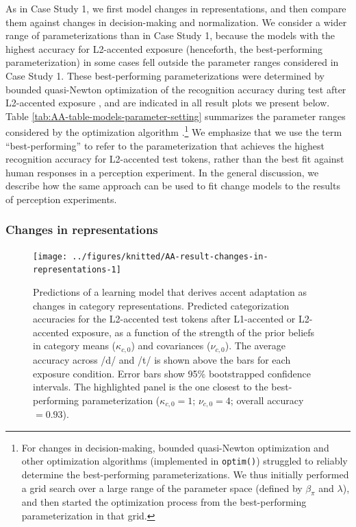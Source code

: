 \documentclass[
  11pt,
  man,floatsintext]{apa6}
\begin{document}
As in Case Study 1, we first model changes in representations, and then compare them against changes in decision-making and normalization. We consider a wider range of parameterizations than in Case Study 1, because the models with the highest accuracy for L2-accented exposure (henceforth, the best-performing parameterization) in some cases fell outside the parameter ranges considered in Case Study 1. These best-performing parameterizations were determined by bounded quasi-Newton optimization of the recognition accuracy during test after L2-accented exposure \autocite[implemented in function \texttt{optim()} in R]{byrd1995}, and are indicated in all result plots we present below. Table \ref{tab:AA-table-models-parameter-setting} summarizes the parameter ranges considered by the optimization algorithm \autocite[\(\nu_{c,0}\) must be larger than the number of cues \(k\) + 1,][p.~134]{murphy2012}.\footnote{\label{fn:optimization} For changes in decision-making, bounded quasi-Newton optimization and other optimization algorithms (implemented in \texttt{optim()}) struggled to reliably determine the best-performing parameterizations. We thus initially performed a grid search over a large range of the parameter space (defined by \(\beta_{\pi}\) and \(\lambda\)), and then started the optimization process from the best-performing parameterization in that grid.} We emphasize that we use the term ``best-performing'' to refer to the parameterization that achieves the highest recognition accuracy for L2-accented test tokens, rather than the best fit against human responses in a perception experiment. In the general discussion, we describe how the same approach can be used to fit change models to the results of perception experiments.

\subsubsection{Changes in representations}\label{changes-in-representations-1}



\begin{figure}

{\centering \texttt{[image: ../figures/knitted/AA-result-changes-in-representations-1]} 

}

\caption{Predictions of a learning model that derives accent adaptation as changes in category representations. Predicted categorization accuracies for the L2-accented test tokens after L1-accented or L2-accented exposure, as a function of the strength of the prior beliefs in category means (\(\kappa_{c,0}\)) and covariances (\(\nu_{c,0}\)). The average accuracy across /d/ and /t/ is shown above the bars for each exposure condition. Error bars show 95\% bootstrapped confidence intervals. The highlighted panel is the one closest to the best-performing parameterization (\(\kappa_{c,0} = 1\); \(\nu_{c,0}=4\); overall accuracy \(=0.93\)).}\label{fig:AA-result-changes-in-representations}
\end{figure}
\end{document}
